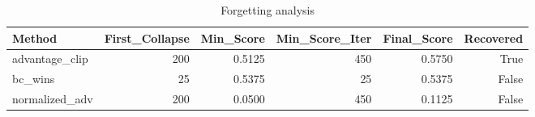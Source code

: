 \begin{table}[htbp]
\centering
\caption{Forgetting analysis}
\label{tab:forgetting}
\begin{tabular}{lrrrrr}
\toprule
\textbf{Method} & \textbf{First\_Collapse} & \textbf{Min\_Score} & \textbf{Min\_Score\_Iter} & \textbf{Final\_Score} & \textbf{Recovered} \\
\midrule
advantage\_clip & 200 & 0.5125 & 450 & 0.5750 & True \\
bc\_wins & 25 & 0.5375 & 25 & 0.5375 & False \\
normalized\_adv & 200 & 0.0500 & 450 & 0.1125 & False \\
\bottomrule
\end{tabular}
\end{table}